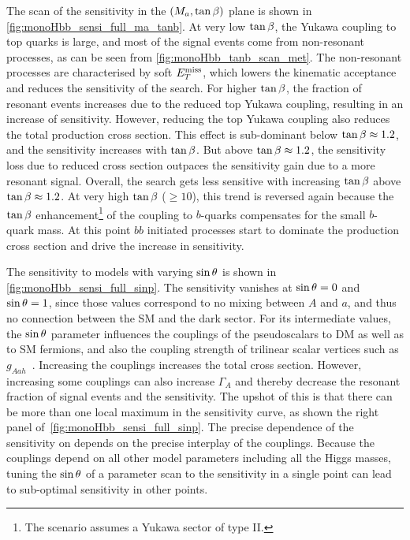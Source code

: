 The scan of the sensitivity in the  $(M_{a},\tan\beta)$ plane is shown in  \autoref{fig:monoHbb_sensi_full_ma_tanb}. 
At very low $\tan\beta$, the Yukawa coupling to top quarks is large, and most of the signal events come from non-resonant processes, as can be seen from \autoref{fig:monoHbb_tanb_scan_met}. %
The non-resonant processes are characterised by soft $E_T^\mathrm{miss}$, which lowers the kinematic acceptance and reduces the sensitivity of the search.
For higher $\tan\beta$, the fraction of resonant events increases due to the reduced top Yukawa coupling, resulting in an increase of sensitivity.
However, reducing the top Yukawa coupling also reduces the total production cross section. 
This effect is sub-dominant below $\tan\beta \approx 1.2$, and the sensitivity increases with $\tan\beta$. 
But above $\tan\beta \approx 1.2$, the sensitivity loss due to reduced cross section outpaces the sensitivity gain due to a more resonant signal.
Overall, the search gets less sensitive with increasing $\tan\beta$ above $\tan\beta \approx 1.2$.
At very high $\tan\beta$ ($\geq 10$), this trend is reversed again because the $\tan\beta$ enhancement\footnote{The \hdma scenario assumes a Yukawa sector of type II.} of the 
coupling to $b$-quarks compensates for the small $b$-quark mass.
At this point $bb$ initiated processes start to dominate the production cross section and drive the increase in sensitivity.

The sensitivity to models with varying $\sin\theta$ is shown in \autoref{fig:monoHbb_sensi_full_sinp}.
The sensitivity vanishes at $\sin\theta=0$ and $\sin\theta=1$, since those values correspond to no mixing between $A$ and $a$, and thus no connection between the SM and the dark sector. 
For its intermediate values, the $\sin\theta$ parameter influences the couplings of the pseudoscalars to DM as well as to SM fermions, 
and also the coupling strength of trilinear scalar vertices such as $g_{Aah}$~\cite{Bauer:2017ota}. 
Increasing the couplings increases the total cross section. 
However, increasing some couplings can also increase $\Gamma_A$ and thereby decrease the resonant fraction of signal events and the sensitivity.
The upshot of this is that there can be more than one local maximum in the sensitivity curve, as shown the right panel of~\autoref{fig:monoHbb_sensi_full_sinp}. 
The precise dependence of the sensitivity on \sinp depends on the precise interplay of the couplings.
Because the couplings depend on all other model parameters including all the Higgs masses, 
tuning the $\sin\theta$ of a parameter scan to the sensitivity in a single point can lead to sub-optimal sensitivity in other points.

